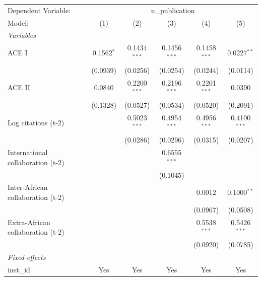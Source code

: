 
\begingroup
\centering
\begin{tabular}{lccccc}
   \tabularnewline \midrule \midrule
   Dependent Variable: & \multicolumn{5}{c}{n\_publication}\\
   Model:                            & (1)          & (2)            & (3)            & (4)            & (5)\\  
   \midrule
   \emph{Variables}\\
   ACE I                             & 0.1562$^{*}$ & 0.1434$^{***}$ & 0.1456$^{***}$ & 0.1458$^{***}$ & 0.0227$^{**}$\\   
                                     & (0.0939)     & (0.0256)       & (0.0254)       & (0.0244)       & (0.0114)\\   
   ACE II                            & 0.0840       & 0.2200$^{***}$ & 0.2196$^{***}$ & 0.2201$^{***}$ & 0.0390\\   
                                     & (0.1328)     & (0.0527)       & (0.0534)       & (0.0520)       & (0.2091)\\   
   Log citations (t-2)               &              & 0.5023$^{***}$ & 0.4954$^{***}$ & 0.4956$^{***}$ & 0.4100$^{***}$\\   
                                     &              & (0.0286)       & (0.0296)       & (0.0315)       & (0.0207)\\   
   International collaboration (t-2) &              &                & 0.6555$^{***}$ &                &   \\   
                                     &              &                & (0.1045)       &                &   \\   
   Inter-African collaboration (t-2) &              &                &                & 0.0012         & 0.1000$^{**}$\\   
                                     &              &                &                & (0.0967)       & (0.0508)\\   
   Extra-African collaboration (t-2) &              &                &                & 0.5538$^{***}$ & 0.5426$^{***}$\\   
                                     &              &                &                & (0.0920)       & (0.0785)\\   
   \midrule
   \emph{Fixed-effects}\\
   inst\_id                          & Yes          & Yes            & Yes            & Yes            & Yes\\  

\end{tabular}
